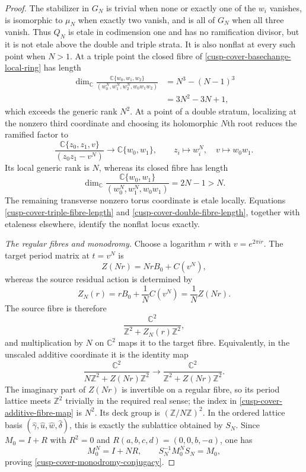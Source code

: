 \begin{proof}
The stabilizer in $G_N$ is trivial when none or exactly one of the $w_i$
vanishes, is isomorphic to $\mu_N$ when exactly two vanish, and is all of
$G_N$ when all three vanish.  Thus $Q_N$ is etale in codimension one and
has no ramification divisor, but it is not etale above the double and
triple strata.  It is also nonflat at every such point when $N>1$.  At a
triple point the closed fibre of \eqref{cusp-cover-basechange-local-ring}
has length
\begin{align}
 \dim_{\mathbb C}
 \frac{\mathbb C\{w_0,w_1,w_2\}}
      {(w_0^N,w_1^N,w_2^N,w_0w_1w_2)}
 &=N^3-(N-1)^3\\
 &=3N^2-3N+1,
 \label{cusp-cover-triple-fibre-length}
\end{align}
which exceeds the generic rank $N^2$.  At a point of a double stratum,
localizing at the nonzero third coordinate and choosing its holomorphic
$N$th root reduces the ramified factor to
\[
 \frac{\mathbb C\{z_0,z_1,v\}}{(z_0z_1-v^N)}
\longrightarrow\mathbb C\{w_0,w_1\},\qquad
 z_i\longmapsto w_i^N,\quad v\longmapsto w_0w_1.
\]
Its local generic rank is $N$, whereas its closed fibre has length
\begin{equation}
 \dim_{\mathbb C}
 \frac{\mathbb C\{w_0,w_1\}}
      {(w_0^N,w_1^N,w_0w_1)}=2N-1>N.
 \label{cusp-cover-double-fibre-length}
\end{equation}
The remaining transverse nonzero torus coordinate is etale locally.
Equations \eqref{cusp-cover-triple-fibre-length} and
\eqref{cusp-cover-double-fibre-length}, together with etaleness elsewhere,
identify the nonflat locus exactly.

\medskip\noindent
\emph{The regular fibres and monodromy.}
Choose a logarithm $r$ with $v=e^{2\pi ir}$.  The target period matrix at
$t=v^N$ is
\[
 Z(Nr)=NrB_0+C(v^N),
\]
whereas the source residual action is determined by
\[
 Z_N(r)=rB_0+\frac1NC(v^N)=\frac1N Z(Nr).
\]
The source fibre is therefore
\[
 \frac{\mathbb C^2}{\mathbb Z^2+Z_N(r)\mathbb Z^2},
\]
and multiplication by $N$ on $\mathbb C^2$ maps it to the target fibre.
Equivalently, in the unscaled additive coordinate it is the identity map
\begin{equation}
 \frac{\mathbb C^2}
      {N\mathbb Z^2+Z(Nr)\mathbb Z^2}
 \longrightarrow
 \frac{\mathbb C^2}
      {\mathbb Z^2+Z(Nr)\mathbb Z^2}.
 \label{cusp-cover-additive-fibre-map}
\end{equation}
The imaginary part of $Z(Nr)$ is invertible on a regular fibre, so its
period lattice meets $\mathbb Z^2$ trivially in the required real sense;
the index in \eqref{cusp-cover-additive-fibre-map} is $N^2$.  Its deck
group is $(\mathbb Z/N\mathbb Z)^2$.  In the ordered lattice basis
$(\widehat\gamma,\widehat u,\widehat w,\widehat\delta)$, this is exactly
the sublattice obtained by $S_N$.  Since $M_0=I+R$ with $R^2=0$ and
$R(a,b,c,d)=(0,0,b,-a)$, one has
\[
 M_0^N=I+NR,\qquad S_N^{-1}M_0^NS_N=M_0,
\]
proving \eqref{cusp-cover-monodromy-conjugacy}.


\end{proof}

